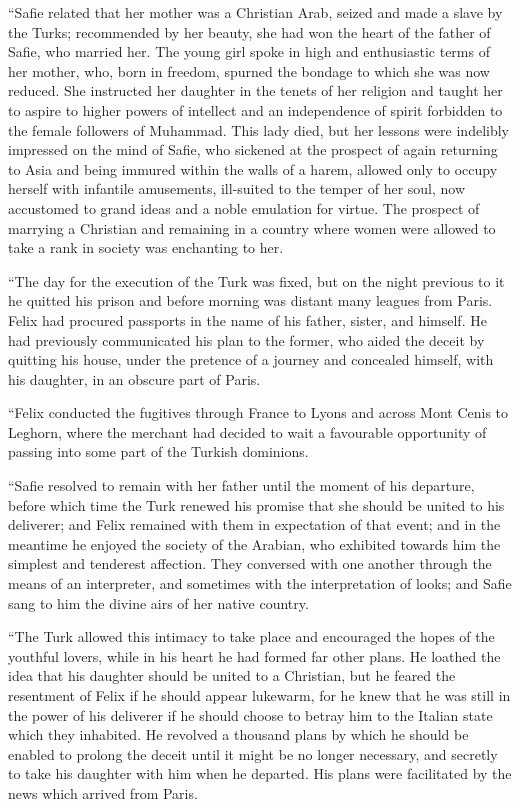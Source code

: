 \documentclass[12pt,openright]{book}
\begin{document}
“Safie related that her mother was a Christian Arab, seized and made a slave by the Turks; recommended by her beauty, she had won the heart of the father of Safie, who married her. The young girl spoke in high and enthusiastic terms of her mother, who, born in freedom, spurned the bondage to which she was now reduced. She instructed her daughter in the tenets of her religion and taught her to aspire to higher powers of intellect and an independence of spirit forbidden to the female followers of Muhammad. This lady died, but her lessons were indelibly impressed on the mind of Safie, who sickened at the prospect of again returning to Asia and being immured within the walls of a harem, allowed only to occupy herself with infantile amusements, ill-suited to the temper of her soul, now accustomed to grand ideas and a noble emulation for virtue. The prospect of marrying a Christian and remaining in a country where women were allowed to take a rank in society was enchanting to her.

“The day for the execution of the Turk was fixed, but on the night previous to it he quitted his prison and before morning was distant many leagues from Paris. Felix had procured passports in the name of his father, sister, and himself. He had previously communicated his plan to the former, who aided the deceit by quitting his house, under the pretence of a journey and concealed himself, with his daughter, in an obscure part of Paris.

“Felix conducted the fugitives through France to Lyons and across Mont Cenis to Leghorn, where the merchant had decided to wait a favourable opportunity of passing into some part of the Turkish dominions.

“Safie resolved to remain with her father until the moment of his departure, before which time the Turk renewed his promise that she should be united to his deliverer; and Felix remained with them in expectation of that event; and in the meantime he enjoyed the society of the Arabian, who exhibited towards him the simplest and tenderest affection. They conversed with one another through the means of an interpreter, and sometimes with the interpretation of looks; and Safie sang to him the divine airs of her native country.

“The Turk allowed this intimacy to take place and encouraged the hopes of the youthful lovers, while in his heart he had formed far other plans. He loathed the idea that his daughter should be united to a Christian, but he feared the resentment of Felix if he should appear lukewarm, for he knew that he was still in the power of his deliverer if he should choose to betray him to the Italian state which they inhabited. He revolved a thousand plans by which he should be enabled to prolong the deceit until it might be no longer necessary, and secretly to take his daughter with him when he departed. His plans were facilitated by the news which arrived from Paris.
\end{document}
